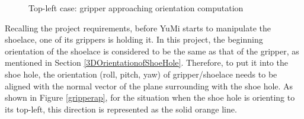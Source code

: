 \begin{figure}[H]
\centering
{}
\caption{Top-left case: gripper approaching orientation computation}
\end{figure}

Recalling the project requirements, before YuMi starts to manipulate the shoelace, one of its grippers is holding it. In this project, the beginning orientation of the shoelace is considered to be the same as that of the gripper, as mentioned in Section \ref{3DOrientationofShoeHole}. Therefore, to put it into the shoe hole, the orientation (roll, pitch, yaw) of gripper\slash shoelace needs to be aligned with the normal vector of the plane surrounding with the shoe hole. As shown in Figure \ref{gripperap}, for the situation when the shoe hole is orienting to its top-left, this direction is represented as the solid orange line. 

